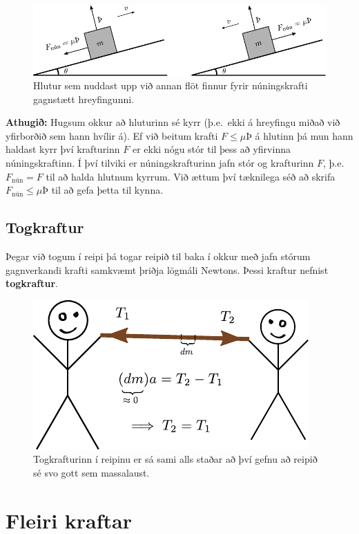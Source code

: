 \ifdefined \wholebook \else\documentclass[oneside]{book}\usepackage{EdlBook}\graphicspath{{figures/}}
\begin{document}
\begin{figure}[H]
    \centering
    \includegraphics{figures/nun.pdf}
    \caption{Hlutur sem nuddast upp við annan flöt finnur fyrir núningskrafti gagnstætt hreyfingunni.}
    \label{fig:fnun}
\end{figure}

\textbf{Athugið:} Hugsum okkur að hluturinn sé kyrr (þ.e.~ekki á hreyfingu miðað við yfirborðið sem hann hvílir á). Ef við beitum krafti $F \leq \mu Þ$ á hlutinn þá mun hann haldast kyrr því krafturinn $F$ er ekki nógu stór til þess að yfirvinna núningskraftinn. Í því tilviki er núningskrafturinn jafn stór og krafturinn $F$, þ.e. $F_{\text{nún}} = F$ til að halda hlutnum kyrrum. Við ættum því tæknilega séð að skrifa $F_{\text{nún}} \leq \mu Þ$ til að gefa þetta til kynna.


\subsection*{Togkraftur}

Þegar við togum í reipi þá togar reipið til baka í okkur með jafn stórum gagnverkandi krafti samkvæmt þriðja lögmáli Newtons. Þessi kraftur nefnist \textbf{togkraftur}.

\begin{figure}[H]
    \centering
    \includegraphics{figures/togkraftur.pdf}
    \caption{Togkrafturinn í reipinu er sá sami alls staðar að því gefnu að reipið sé svo gott sem massalaust.}
    \label{fig:togkraftur}
\end{figure}


\section{Fleiri kraftar}
\end{document}

